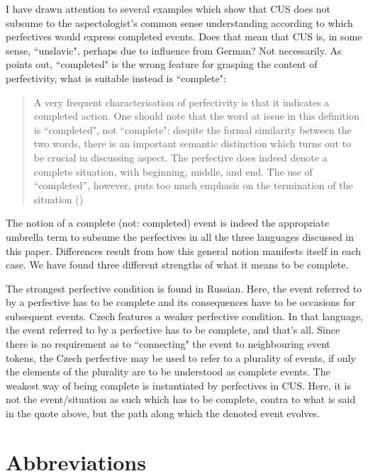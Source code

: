 \documentclass[output=paper,colorlinks,citecolor=brown]{langscibook}
\begin{document}
I have drawn attention to several examples which show that CUS does not subsume to the aspectologist's common sense understanding according to which perfectives would express completed events. 
Does that mean that CUS is, in some sense, ``unslavic", perhaps due to influence from German?
Not necessarily. 
As \citet{mue:Comrie1976} points out, ``completed" is the wrong feature  
for grasping the content of perfectivity, what is suitable instead is ``complete": 

\begin{quote}
    A very frequent characterisation of perfectivity is that it indicates a completed action. 
 One should note that the word at issue in this definition is ``completed",
not ``complete": despite the formal similarity between the two words, there is an
important semantic distinction which turns out to be crucial in discussing aspect.
The perfective does indeed denote a complete situation, with beginning, middle,
and end. The use of ``completed”, however, puts too much emphasis on the
termination of the situation (\citealt[18]{mue:Comrie1976})
\end{quote}

The notion of a complete (not: completed) event is indeed the appropriate umbrella term to subsume the perfectives in all the three languages discussed in this paper. Differences result from how this general notion manifests itself in each case. We have found three different strengths of what it means to be complete. 

The strongest perfective condition is found in Russian. Here, the event referred to by a perfective has to be complete and its consequences have to be occasions for subsequent events. Czech features a weaker perfective condition. In that language, the event referred to by a perfective has to be complete, and that's all. Since there is no requirement as to ``connecting" the event to neighbouring event tokens, the Czech perfective may be used to refer to a plurality of events, if only the elements of the plurality are to be understood as complete events.
The weakest way of being complete is instantiated by perfectives in CUS. Here, it is not the event/situation as such which has to be complete, contra to what is said in the quote above, but the path along which the denoted event evolves.    

\section*{Abbreviations}
\end{document}
